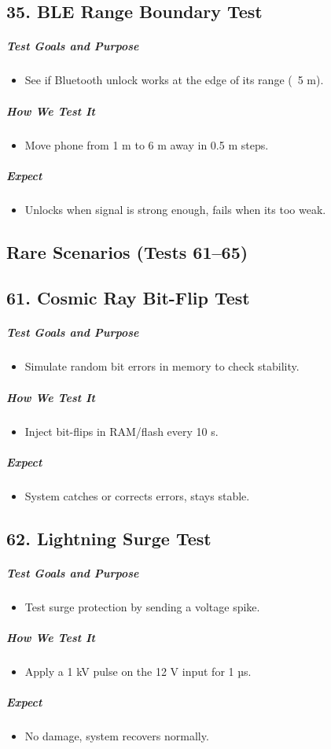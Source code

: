 \subsection*{35. BLE Range Boundary Test}
\subparagraph{Test Goals and Purpose}
\begin{itemize}
    \item See if Bluetooth unlock works at the edge of its range (~5 m).
\end{itemize}
\subparagraph{How We Test It}
\begin{itemize}
    \item Move phone from 1 m to 6 m away in 0.5 m steps.
\end{itemize}
\subparagraph{ Expect}
\begin{itemize}
    \item Unlocks when signal is strong enough, fails when its too weak.
\end{itemize}

\newpage
\subsection*{Rare Scenarios (Tests 61–65)}

\subsection*{61. Cosmic Ray Bit-Flip Test}
\subparagraph{Test Goals and Purpose}
\begin{itemize}
    \item Simulate random bit errors in memory to check stability.
\end{itemize}
\subparagraph{How We Test It}
\begin{itemize}
    \item Inject bit-flips in RAM/flash every 10 s.
\end{itemize}
\subparagraph{ Expect}
\begin{itemize}
    \item System catches or corrects errors, stays stable.
\end{itemize}

\subsection*{62. Lightning Surge Test}
\subparagraph{Test Goals and Purpose}
\begin{itemize}
    \item Test surge protection by sending a voltage spike.
\end{itemize}
\subparagraph{How We Test It}
\begin{itemize}
    \item Apply a 1 kV pulse on the 12 V input for 1 µs.
\end{itemize}
\subparagraph{ Expect}
\begin{itemize}
    \item No damage, system recovers normally.
\end{itemize}


